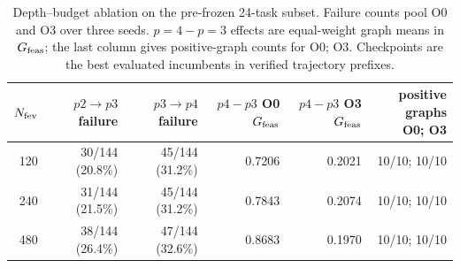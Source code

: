 \begin{table}[t]
\centering
\caption{Depth--budget ablation on the pre-frozen 24-task subset. Failure
counts pool O0 and O3 over three seeds. $p=4-p=3$ effects are equal-weight
graph means in $G_{\mathrm{feas}}$; the last column gives positive-graph counts for
O0; O3. Checkpoints are the best evaluated incumbents in verified trajectory
prefixes.}
\label{tab:reviewer-depth-budget}
\small
\begin{tabular}{@{}rrrrrr@{}}
\toprule
$N_{\rm fev}$ & $p2\to p3$ failure & $p3\to p4$ failure & \shortstack{$p4-p3$\\O0 $G_{\mathrm{feas}}$} & \shortstack{$p4-p3$\\O3 $G_{\mathrm{feas}}$} & \shortstack{positive graphs\\O0; O3} \\
\midrule
120 & 30/144 (20.8\%) & 45/144 (31.2\%) & 0.7206 & 0.2021 & 10/10; 10/10 \\
240 & 31/144 (21.5\%) & 45/144 (31.2\%) & 0.7843 & 0.2074 & 10/10; 10/10 \\
480 & 38/144 (26.4\%) & 47/144 (32.6\%) & 0.8683 & 0.1970 & 10/10; 10/10 \\
\bottomrule
\end{tabular}
\end{table}
